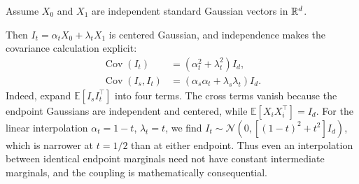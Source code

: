 \documentclass[12pt,a4paper,oneside]{book}
\begin{document}
\begin{example}
\label{ex:gaussian-interpolants}
\label{src:p14q1}
\begin{Question}
Assume $X_0$ and $X_1$ are independent standard Gaussian vectors in
$\mathbb{R}^d$.
\end{Question}
\begin{solution}
Then $I_t=\alpha_tX_0+\lambda_tX_1$ is centered Gaussian, and independence
makes the covariance calculation explicit:
\begin{equation*}
\begin{aligned}
\operatorname{Cov}(I_t)&=(\alpha_t^2+\lambda_t^2)I_d,\\
\operatorname{Cov}(I_s,I_t)&=(\alpha_s\alpha_t+\lambda_s\lambda_t)I_d.
\end{aligned}
\end{equation*}
Indeed, expand $\mathbb E[I_sI_t^\top]$ into four terms.
The cross terms vanish because the endpoint Gaussians are independent
and centered, while $\mathbb E[X_iX_i^\top]=I_d$.
For the linear interpolation $\alpha_t=1-t$, $\lambda_t=t$,
we find $I_t\sim\mathcal N(0,[(1-t)^2+t^2]I_d)$, which is narrower
at $t=1/2$ than at either endpoint. Thus even an interpolation between
identical endpoint marginals need not have constant intermediate
marginals, and the coupling is mathematically consequential.
\end{solution}
\end{example}
\end{document}
